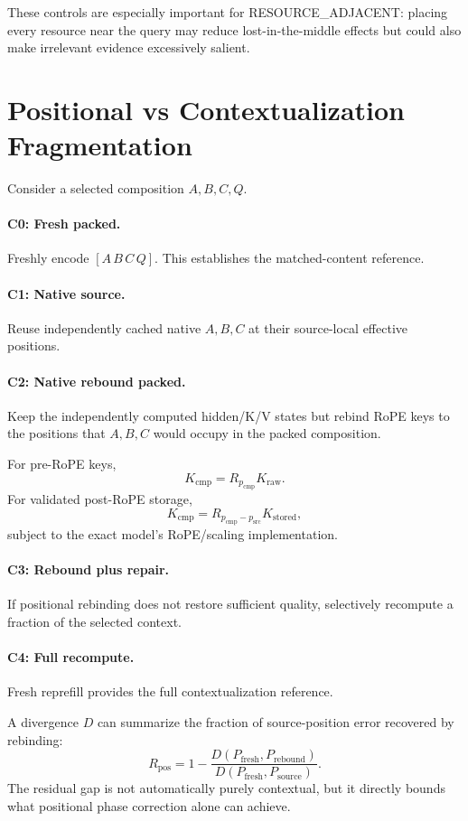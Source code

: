 \documentclass[11pt]{article}
\begin{document}
These controls are especially important for RESOURCE\_ADJACENT: placing every resource near the query may reduce lost-in-the-middle effects but could also make irrelevant evidence excessively salient.

\section{Positional vs Contextualization Fragmentation}
\label{sec:fragmentation}

Consider a selected composition $A,B,C,Q$.

\paragraph{C0: Fresh packed.}
Freshly encode $[A\,B\,C\,Q]$.  This establishes the matched-content reference.

\paragraph{C1: Native source.}
Reuse independently cached native $A,B,C$ at their source-local effective positions.

\paragraph{C2: Native rebound packed.}
Keep the independently computed hidden/K/V states but rebind RoPE keys to the positions that $A,B,C$ would occupy in the packed composition.

For pre-RoPE keys,
\[
K_{\mathrm{cmp}}=R_{p_{\mathrm{cmp}}}K_{\mathrm{raw}}.
\]
For validated post-RoPE storage,
\[
K_{\mathrm{cmp}}
=
R_{p_{\mathrm{cmp}}-p_{\mathrm{src}}}
K_{\mathrm{stored}},
\]
subject to the exact model's RoPE/scaling implementation.

\paragraph{C3: Rebound plus repair.}
If positional rebinding does not restore sufficient quality, selectively recompute a fraction of the selected context.

\paragraph{C4: Full recompute.}
Fresh reprefill provides the full contextualization reference.

A divergence $D$ can summarize the fraction of source-position error recovered by rebinding:
\[
R_{\mathrm{pos}}
=
1 -
\frac{D(P_{\mathrm{fresh}},P_{\mathrm{rebound}})}
     {D(P_{\mathrm{fresh}},P_{\mathrm{source}})}.
\]
The residual gap is not automatically purely contextual, but it directly bounds what positional phase correction alone can achieve.
\end{document}
